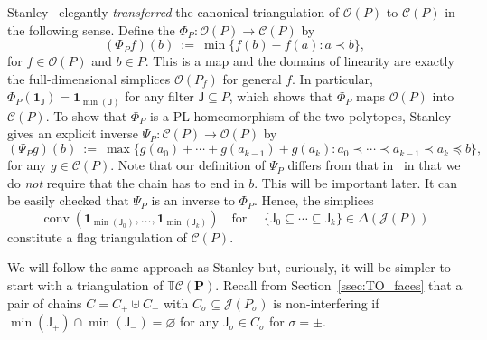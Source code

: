 \documentclass[11pt]{amsart}
\theoremstyle{definition}
\begin{document}
Stanley~\cite{TwoPoset} elegantly \emph{transferred} the canonical
triangulation of ${\mathcal{O}({P})}$ to ${\mathcal{C}({P})}$ in the following sense. Define the
{\textbf{\color{black}{transfer map}}} ${\Phi}_{P} : {\mathcal{O}({P})} \rightarrow {\mathcal{C}({P})}$ by
\begin{equation}\label{eqn:transfer}
    ({\Phi}_{P} f)(b) \ := \ \min\{ f(b) - f(a) : a \prec b \},
\end{equation}
for $f \in {\mathcal{O}({P})}$ and $b \in {P}$. This is a {\textbf{\color{black}{piecewise linear}}} map and
the domains of linearity are exactly the full-dimensional simplices
${\mathcal{O}({{P}_f})}$ for general $f$. In particular, ${\Phi}_{P}({\mathbf{1}}_{\mathsf{J}}) =
{\mathbf{1}}_{\min({\mathsf{J}})}$ for any filter ${\mathsf{J}} \subseteq {P}$, which shows that
${\Phi}_{P}$ maps ${\mathcal{O}({P})}$ into ${\mathcal{C}({P})}$. To show that ${\Phi}_{P}$
is a PL homeomorphism of the two polytopes, Stanley gives an explicit inverse
${\Psi}_{P} : {\mathcal{C}({P})} \rightarrow {\mathcal{O}({P})}$ by
\begin{equation}\label{eqn:itransfer}
    ({\Psi}_{P} g)(b) \ := \ \max\{ g(a_0) + \cdots + g(a_{k-1}) +
    g(a_k) : a_0 \prec \cdots \prec a_{k-1} \prec a_k \preceq b \},
\end{equation}
for any $g \in {\mathcal{C}({P})}$.
Note that our definition of ${\Psi}_{P}$ differs from that in~\cite{TwoPoset} in
that we do \emph{not} require that the chain has to end in $b$. This will be
important later. It can be easily checked that  ${\Psi}_{P}$ is an inverse to
${\Phi}_{P}$. Hence, the simplices
\[
    \operatorname{conv}( {\mathbf{1}}_{\min({\mathsf{J}}_0)}, \dots, {\mathbf{1}}_{\min({\mathsf{J}}_k)} ) \quad \text{
    for } \quad \{ {\mathsf{J}}_0 \subseteq  \cdots \subseteq {\mathsf{J}}_k \} \in
    \Delta({{\mathcal{J}}({P})})
\]
constitute a flag triangulation of ${\mathcal{C}({P})}$.

We will follow the same approach as Stanley but, curiously, it will be simpler
to start with a triangulation of ${{\mathbb{T}}{\mathcal{C}({{{\mathbf{P}}}})}}$. Recall from
Section~\ref{ssec:TO_faces} that a pair of chains $C = C_+ \uplus C_-$ with
$C_\sigma \subseteq {{\mathcal{J}}({{P}_\sigma})}$ is non-interfering if $\min({\mathsf{J}}_+)
\cap \min({\mathsf{J}}_-) = {\varnothing}$ for any ${\mathsf{J}}_\sigma \in C_\sigma$ for
$\sigma = \pm$.
\end{document}
